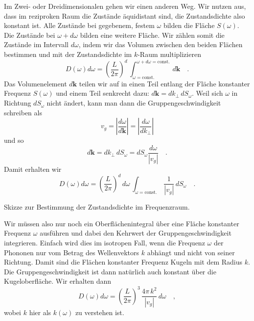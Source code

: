 Im Zwei- oder Dreidimensionalen gehen wir einen anderen Weg. Wir nutzen aus, dass im reziproken Raum die Zustände äquidistant sind, die Zustandsdichte also konstant ist. Alle Zustände bei gegebenem, festem $\omega$ bilden die Fläche $S(\omega)$. Die Zustände bei $\omega + d\omega$ bilden eine weitere Fläche. Wir zählen somit die Zustände im Intervall $d\omega$, indem wir das Volumen zwischen den beiden Flächen bestimmen und mit der Zustandsdichte im $k$-Raum multiplizieren
\begin{equation}
D(\omega) d\omega = \left( \frac{L}{2 \pi} \right)^d \, \int_{\omega = \text{const.}}^{\omega + d\omega = \text{const.}} \, d \mathbf{k} \quad .
\end{equation}
Das Volumenelement $d \mathbf{k}$ teilen wir auf in einen Teil entlang der Fläche konstanter Frequenz $S(\omega)$ und einem Teil senkrecht dazu:  $d \mathbf{k} = dk_\perp \, dS_\omega$. Weil sich $\omega$ in Richtung $ dS_\omega$ nicht ändert,  kann man dann die Gruppengeschwindigkeit schreiben als
\begin{equation}
v_g = \left| \frac{d\omega}{d \mathbf{k}} \right| 
=\left| \frac{d\omega}{d k_\perp} \right|
\end{equation}
und so
\begin{equation}
d \mathbf{k} = dk_\perp \, dS_\omega = dS_\omega \frac{d \omega}{|v_g|} \quad .
\end{equation}
Damit erhalten wir
\begin{equation}
D(\omega) d\omega = \left( \frac{L}{2 \pi} \right)^d \, d\omega \, \int_{\omega = \text{const.}}\,   \frac{1}{|v_g|} \, dS_\omega \quad . \label{eq:WK_dos_omega}
\end{equation}
\begin{marginfigure}

\caption{Skizze zur Bestimmung der Zustandsdichte im Frequenzraum.}
\end{marginfigure}
Wir müssen also nur noch ein Oberflächenintegral über eine Fläche konstanter Frequenz $\omega$ ausführen und dabei den Kehrwert der Gruppengeschwindigkeit integrieren. Einfach wird dies im isotropen Fall, wenn die Frequenz $\omega$ der Phononen nur vom Betrag des Wellenvektors $k$ abhängt und nicht von seiner Richtung. Damit sind die Flächen konstanter Frequenz Kugeln mit dem Radius $k$.  Die Gruppengeschwindigkeit ist dann natürlich auch konstant über die Kugeloberfläche. Wir erhalten dann
\begin{equation}
D(\omega) d\omega = \left( \frac{L}{2 \pi} \right)^3 \,     \frac{ 4 \pi \, k^2 }{|v_g|}   \, d\omega  \quad ,
\end{equation} 
wobei $k$ hier als $k(\omega)$ zu verstehen ist.

